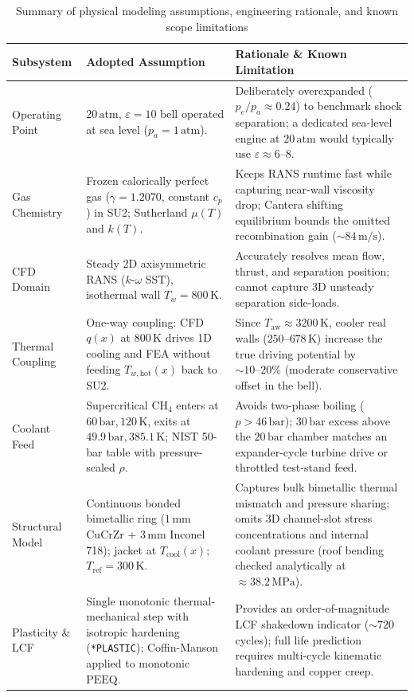 \documentclass[11pt,a4paper]{article}
\begin{document}
\begin{table}[H]
\centering
\caption{Summary of physical modeling assumptions, engineering rationale, and known scope limitations}
\label{tab:assumptions}
\vspace{0.2cm}
\small
\begin{tabular}{p{2.5cm}p{5.5cm}p{6.6cm}}
\toprule
\textbf{Subsystem} & \textbf{Adopted Assumption} & \textbf{Rationale \& Known Limitation} \\
\midrule
Operating Point & $20\,\mathrm{atm}$, $\varepsilon = 10$ bell operated at sea level ($p_a = 1\,\mathrm{atm}$). & Deliberately overexpanded ($p_e/p_a \approx 0.24$) to benchmark shock separation; a dedicated sea-level engine at $20\,\mathrm{atm}$ would typically use $\varepsilon \approx 6\text{--}8$. \\
Gas Chemistry & Frozen calorically perfect gas ($\gamma = 1.2070$, constant $c_p$) in SU2; Sutherland $\mu(T)$ and $k(T)$. & Keeps RANS runtime fast while capturing near-wall viscosity drop; Cantera shifting equilibrium bounds the omitted recombination gain ($\sim 84\,\mathrm{m/s}$). \\
CFD Domain & Steady 2D axisymmetric RANS ($k$-$\omega$ SST), isothermal wall $T_w = 800\,\mathrm{K}$. & Accurately resolves mean flow, thrust, and separation position; cannot capture 3D unsteady separation side-loads. \\
Thermal Coupling & One-way coupling: CFD $q(x)$ at $800\,\mathrm{K}$ drives 1D cooling and FEA without feeding $T_{w,\mathrm{hot}}(x)$ back to SU2. & Since $T_{\mathrm{aw}} \approx 3200\,\mathrm{K}$, cooler real walls ($250\text{--}678\,\mathrm{K}$) increase the true driving potential by $\sim 10\text{--}20\%$ (moderate conservative offset in the bell). \\
Coolant Feed & Supercritical $\mathrm{CH_4}$ enters at $60\,\mathrm{bar}, 120\,\mathrm{K}$, exits at $49.9\,\mathrm{bar}, 385.1\,\mathrm{K}$; NIST 50-bar table with pressure-scaled $\rho$. & Avoids two-phase boiling ($p > 46\,\mathrm{bar}$); $30\,\mathrm{bar}$ excess above the $20\,\mathrm{bar}$ chamber matches an expander-cycle turbine drive or throttled test-stand feed. \\
Structural Model & Continuous bonded bimetallic ring ($1\,\mathrm{mm}$ $\mathrm{CuCrZr}$ + $3\,\mathrm{mm}$ Inconel 718); jacket at $T_{\mathrm{cool}}(x)$; $T_{\mathrm{ref}} = 300\,\mathrm{K}$. & Captures bulk bimetallic thermal mismatch and pressure sharing; omits 3D channel-slot stress concentrations and internal coolant pressure (roof bending checked analytically at $\approx 38.2\,\mathrm{MPa}$). \\
Plasticity \& LCF & Single monotonic thermal-mechanical step with isotropic hardening (\texttt{*PLASTIC}); Coffin-Manson applied to monotonic $\mathrm{PEEQ}$. & Provides an order-of-magnitude LCF shakedown indicator ($\sim 720$ cycles); full life prediction requires multi-cycle kinematic hardening and copper creep. \\
\bottomrule
\end{tabular}
\end{table}
\end{document}
